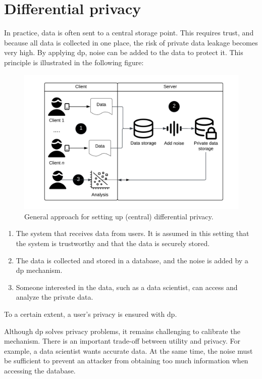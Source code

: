 % 
\section{Differential privacy} \label{section:dp}
In practice, data is often sent to a central storage point.
This requires trust, and because all data is collected in one place, the risk of private data leakage becomes very high.
By applying \gls{dp}, noise can be added to the data to protect it.
This principle is illustrated in the following figure:
\begin{figure}[H]
  \includegraphics[width=1\textwidth]{TheorethicalFramework/Differential privacy/central-dp.png}
  \caption{General approach for setting up (central) differential privacy.}
  \label{fig:central-dp}
\end{figure}

\begin{enumerate}
  \item The system that receives data from users. It is assumed in this setting that the system is trustworthy and that the data is securely stored.
  \item The data is collected and stored in a database, and the noise is added by a \gls{dp} mechanism.
  \item Someone interested in the data, such as a data scientist, can access and analyze the private data.
\end{enumerate}
To a certain extent, a user's privacy is ensured with \gls{dp}. \newline

Although \gls{dp} solves privacy problems, it remains challenging to calibrate the mechanism.
There is an important trade-off between utility and privacy.
For example, a data scientist wants accurate data. At the same time, the noise must be sufficient to prevent an attacker from obtaining too much information when accessing the database.

